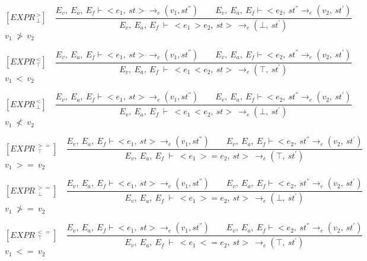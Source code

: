    	\[
   	[EXPR^{\ >}_{\ \bot}] \quad
   	\dfrac{E_v, \ E_a, \ E_f \vdash <e_1, \ st> \rightarrow_e (v_1, st^{''}) \qquad E_v, \ E_a, \ E_f \vdash <e_2, \ st^{''} \rightarrow_e (v_2, \ st^{'})}{E_v, \ E_a, \ E_f \ \vdash \ <e_1 \ > e_2, \ st> \ \rightarrow_e (\bot, \ st^{'})}
   	\]
	\begin{math}
   	v_1 \ \not> \ v_2
   	\end{math}   
   	
   	\[
   	[EXPR^{\ <}_{\ \top}] \quad
   	\dfrac{E_v, \ E_a, \ E_f \vdash <e_1, \ st> \rightarrow_e (v_1, st^{''}) \qquad E_v, \ E_a, \ E_f \vdash <e_2, \ st^{''} \rightarrow_e (v_2, \ st^{'})}{E_v, \ E_a, \ E_f \ \vdash \ <e_1 \ < e_2, \ st> \ \rightarrow_e (\top, \ st^{'})}
   	\]
	\begin{math}
   	v_1 \ < \ v_2
   	\end{math}   	
   	

   	\[
   	[EXPR^{\ <}_{\ \bot}] \quad
   	\dfrac{E_v, \ E_a, \ E_f \vdash <e_1, \ st> \rightarrow_e (v_1, st^{''}) \qquad E_v, \ E_a, \ E_f \vdash <e_2, \ st^{''} \rightarrow_e (v_2, \ st^{'})}{E_v, \ E_a, \ E_f \ \vdash \ <e_1 \ < e_2, \ st> \ \rightarrow_e (\bot, \ st^{'})}
   	\]
	\begin{math}
   	v_1 \ \not< \ v_2
   	\end{math}
   	
   	\[
   	[EXPR^{\ >=}_{\ \ \top}] \quad
   	\dfrac{E_v, \ E_a, \ E_f \vdash <e_1, \ st> \rightarrow_e (v_1, st^{''}) \qquad E_v, \ E_a, \ E_f \vdash <e_2, \ st^{''} \rightarrow_e (v_2, \ st^{'})}{E_v, \ E_a, \ E_f \ \vdash \ <e_1 \ >= e_2, \ st> \ \rightarrow_e (\top, \ st^{'})}
   	\]
	\begin{math}
   	v_1 \ >= \ v_2
   	\end{math}   	
   	

   	\[
   	[EXPR^{\ >=}_{\ \ \bot}] \quad
   	\dfrac{E_v, \ E_a, \ E_f \vdash <e_1, \ st> \rightarrow_e (v_1, st^{''}) \qquad E_v, \ E_a, \ E_f \vdash <e_2, \ st^{''} \rightarrow_e (v_2, \ st^{'})}{E_v, \ E_a, \ E_f \ \vdash \ <e_1 \ >= e_2, \ st> \ \rightarrow_e (\bot, \ st^{'})}
   	\]
	\begin{math}
   	v_1 \ \not>= \ v_2
   	\end{math}
   	
   	\[
   	[EXPR^{\ <=}_{\ \ \top}] \quad
   	\dfrac{E_v, \ E_a, \ E_f \vdash <e_1, \ st> \rightarrow_e (v_1, st^{''}) \qquad E_v, \ E_a, \ E_f \vdash <e_2, \ st^{''} \rightarrow_e (v_2, \ st^{'})}{E_v, \ E_a, \ E_f \ \vdash \ <e_1 \ <= e_2, \ st> \ \rightarrow_e (\top, \ st^{'})}
   	\]
	\begin{math}
   	v_1 \ <= \ v_2
   	\end{math}   	
   	


